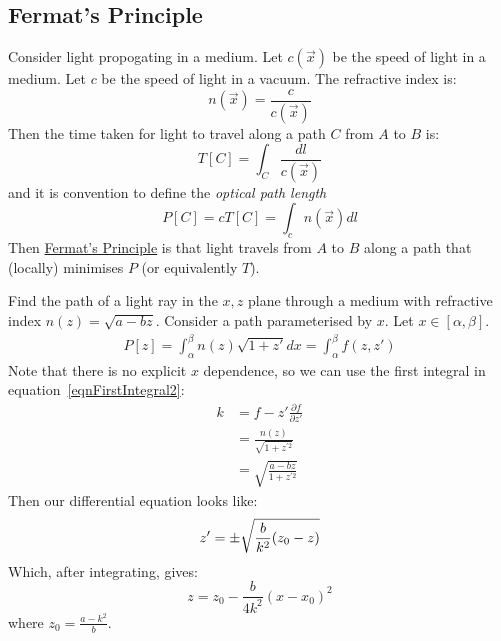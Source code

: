 \documentclass[../Main.tex]{subfiles}
\begin{document}
\subsection{Fermat's Principle}
Consider light propogating in a medium. Let $c(\vec{x})$ be the speed of light in a medium. Let $c$ be the speed of light in a vacuum. The refractive index is:
\begin{equation*}
    n(\vec{x}) = \frac{c}{c(\vec{x})}
\end{equation*}
Then the time taken for light to travel along a path $C$ from $A$ to $B$ is:
\begin{equation*}
    T[C] = \int_C \frac{dl}{c(\vec{x})}
\end{equation*}
and it is convention to define the \textit{optical path length}
\begin{equation*}
    P[C] = cT[C] = \int_c n(\vec{x}) dl
\end{equation*}
Then \underline{Fermat's Principle} is that light travels from $A$ to $B$ along a path that (locally) minimises $P$ (or equivalently $T$).
\begin{example}
    Find the path of a light ray in the $x, z$ plane through a medium with refractive index $n(z) = \sqrt{a - bz}$.
    Consider a path parameterised by $x$. Let $x \in [\alpha, \beta]$.
    \begin{align}
        P[z] = \int_\alpha^\beta n(z) \sqrt{1 + z'} dx = \int_\alpha^\beta f(z, z')
    \end{align}
    Note that there is no explicit $x$ dependence, so we can use the first integral in equation~\ref{eqnFirstIntegral2}:
    \begin{align*}
        k &= f - z'\frac{\partial f}{\partial z'} \\
        &= \frac{n(z)}{\sqrt{1 + z^{\prime 2}}} \\
        &= \sqrt{\frac{a - bz}{1 + z^{\prime 2}}}
    \end{align*}
    Then our differential equation looks like:
    \begin{equation*}
        z' = \pm \sqrt{\frac{b}{k^2}(z_0 - z)} \\
    \end{equation*}
    Which, after integrating, gives:
    \begin{equation*}
        z = z_0 - \frac{b}{4k^2}(x - x_0)^2
    \end{equation*}
    where $z_0 = \frac{a - k^2}{b}$.
\end{example}
\end{document}

